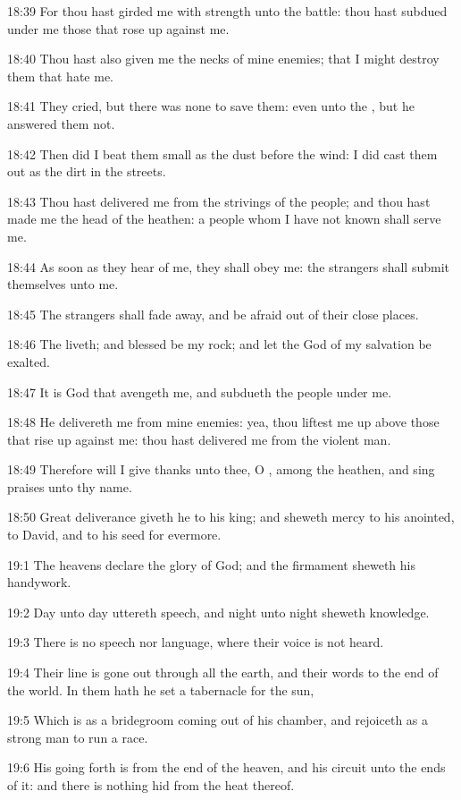 18:39 For thou hast girded me with strength unto the battle: thou hast
subdued under me those that rose up against me.

18:40 Thou hast also given me the necks of mine enemies; that I might
destroy them that hate me.

18:41 They cried, but there was none to save them: even unto the \LORD,
but he answered them not.

18:42 Then did I beat them small as the dust before the wind: I did
cast them out as the dirt in the streets.

18:43 Thou hast delivered me from the strivings of the people; and
thou hast made me the head of the heathen: a people whom I have not
known shall serve me.

18:44 As soon as they hear of me, they shall obey me: the strangers
shall submit themselves unto me.

18:45 The strangers shall fade away, and be afraid out of their close
places.

18:46 The \LORD liveth; and blessed be my rock; and let the God of my
salvation be exalted.

18:47 It is God that avengeth me, and subdueth the people under me.

18:48 He delivereth me from mine enemies: yea, thou liftest me up
above those that rise up against me: thou hast delivered me from the
violent man.

18:49 Therefore will I give thanks unto thee, O \LORD, among the
heathen, and sing praises unto thy name.

18:50 Great deliverance giveth he to his king; and sheweth mercy to
his anointed, to David, and to his seed for evermore.



19:1 The heavens declare the glory of God; and the firmament sheweth
his handywork.

19:2 Day unto day uttereth speech, and night unto night sheweth
knowledge.

19:3 There is no speech nor language, where their voice is not heard.

19:4 Their line is gone out through all the earth, and their words to
the end of the world. In them hath he set a tabernacle for the sun,

19:5 Which is as a bridegroom coming out of his chamber, and rejoiceth
as a strong man to run a race.

19:6 His going forth is from the end of the heaven, and his circuit
unto the ends of it: and there is nothing hid from the heat thereof.

